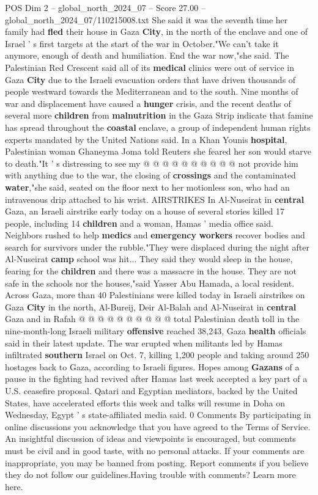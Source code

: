 \begin{textsample}{POS Dim 2 – global\_north\_2024\_07 – Score 27.00 – global\_north\_2024\_07/110215008.txt}
She said it was the seventh time her family had \textbf{fled} their house in Gaza \textbf{City}, in the north of the enclave and one of Israel ' s first targets at the start of the war in October."We can't take it anymore, enough of death and humiliation.
End the war now,"she said.
The Palestinian Red Crescent said all of its \textbf{medical} clinics were out of service in Gaza \textbf{City} due to the Israeli evacuation orders that have driven thousands of people westward towards the Mediterranean and to the south.
Nine months of war and displacement have caused a \textbf{hunger} crisis, and the recent deaths of several more \textbf{children} from \textbf{malnutrition} in the Gaza Strip indicate that famine has spread throughout the \textbf{coastal} enclave, a group of independent human rights experts mandated by the United Nations said.
In a Khan Younis \textbf{hospital}, Palestinian woman Ghaneyma Joma told Reuters she feared her son would starve to death."It ' s distressing to see my @ @ @ @ @ @ @ @ @ @ not provide him with anything due to the war, the closing of \textbf{crossings} and the contaminated \textbf{water},"she said, seated on the floor next to her motionless son, who had an intravenous drip attached to his wrist.
AIRSTRIKES In Al-Nuseirat in \textbf{central} Gaza, an Israeli airstrike early today on a house of several stories killed 17 people, including 14 \textbf{children} and a woman, Hamas ' media office said.
Neighbors rushed to help \textbf{medics} and \textbf{emergency} \textbf{workers} recover bodies and search for survivors under the rubble."They were displaced during the night after Al-Nuseirat \textbf{camp} school was hit...
They said they would sleep in the house, fearing for the \textbf{children} and there was a massacre in the house.
They are not safe in the schools nor the houses,"said Yasser Abu Hamada, a local resident.
Across Gaza, more than 40 Palestinians were killed today in Israeli airstrikes on Gaza \textbf{City} in the north, Al-Bureij, Deir Al-Balah and Al-Nuseirat in \textbf{central} Gaza and in Rafah @ @ @ @ @ @ @ @ @ @ total Palestinian death toll in the nine-month-long Israeli military \textbf{offensive} reached 38,243, Gaza \textbf{health} officials said in their latest update.
The war erupted when militants led by Hamas infiltrated \textbf{southern} Israel on Oct. 7, killing 1,200 people and taking around 250 hostages back to Gaza, according to Israeli figures.
Hopes among \textbf{Gazans} of a pause in the fighting had revived after Hamas last week accepted a key part of a U.S. ceasefire proposal.
Qatari and Egyptian mediators, backed by the United States, have accelerated efforts this week and talks will resume in Doha on Wednesday, Egypt ' s state-affiliated media said. 0 Comments By participating in online discussions you acknowledge that you have agreed to the Terms of Service.
An insightful discussion of ideas and viewpoints is encouraged, but comments must be civil and in good taste, with no personal attacks.
If your comments are inappropriate, you may be banned from posting.
Report comments if you believe they do not follow our guidelines.Having trouble with comments?
Learn more here.


\end{textsample}
